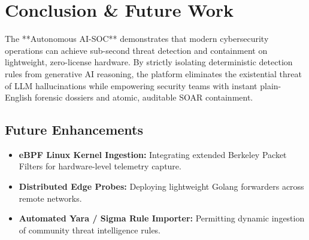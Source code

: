 \documentclass[11pt,a4paper]{article}
\begin{document}
\section{Conclusion \& Future Work}

The **Autonomous AI-SOC** demonstrates that modern cybersecurity operations can achieve sub-second threat detection and containment on lightweight, zero-license hardware. By strictly isolating deterministic detection rules from generative AI reasoning, the platform eliminates the existential threat of LLM hallucinations while empowering security teams with instant plain-English forensic dossiers and atomic, auditable SOAR containment.

\subsection{Future Enhancements}
\begin{itemize}
    \item \textbf{eBPF Linux Kernel Ingestion:} Integrating extended Berkeley Packet Filters for hardware-level telemetry capture.
    \item \textbf{Distributed Edge Probes:} Deploying lightweight Golang forwarders across remote networks.
    \item \textbf{Automated Yara / Sigma Rule Importer:} Permitting dynamic ingestion of community threat intelligence rules.
\end{itemize}
\end{document}
